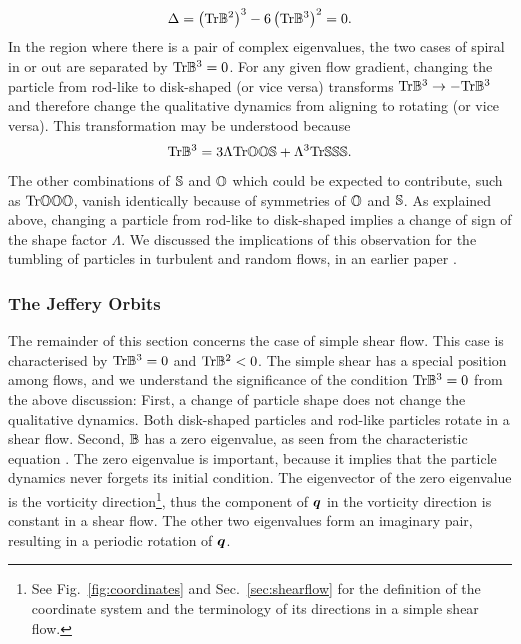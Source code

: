 \documentclass[thesis.tex]{subfiles}
\begin{document}
\begin{align}
 	\Delta = \left(\mbox{Tr} \mathbb{B}^2\right)^3 - 6\left(\mbox{Tr} \mathbb{B}^3\right)^2 = 0.
 \end{align} 
In the region where there is a pair of complex eigenvalues, the two cases of spiral in or out are separated by $\mbox{Tr} \mathbb{B}^3=0$. For any given flow gradient, changing the particle from rod-like to disk-shaped (or vice versa) transforms $\mbox{Tr} \mathbb{B}^3\to-\mbox{Tr}\mathbb{B}^3$ and therefore change the qualitative dynamics from aligning to rotating (or vice versa). This transformation may be understood because
\begin{align}
	\mbox{Tr} \mathbb{B}^3 = 3\Lambda \mbox{Tr} \mathbb{O}\mathbb{O} \mathbb{S} + \Lambda^3 \mbox{Tr} \mathbb{S}\mathbb{S} \mathbb{S}.
\end{align}
The other combinations of $\mathbb{S}$ and $\mathbb{O}$ which could be expected to contribute, such as $\mbox{Tr} \mathbb{O}\mathbb{O} \mathbb{O}$, vanish identically because of symmetries of $\mathbb{O}$ and $\mathbb{S}$. As explained above, changing a particle from rod-like to disk-shaped implies a change of sign of the shape factor $\Lambda$. We discussed the implications of this observation for the tumbling of particles in turbulent and random flows, in an earlier paper \cite{gustavsson2014}.

\subsubsection{The Jeffery Orbits}

The remainder of this section concerns the case of simple shear flow. This case is characterised by $\mbox{Tr} \mathbb{B}^3=0$ and $\mbox{Tr} \mathbb{B}^2<0$. The simple shear has a special position among flows, and we understand the significance of the condition $\mbox{Tr}\mathbb{B}^3=0$ from the above discussion: First, a change of particle shape does not change the qualitative dynamics. Both disk-shaped particles and rod-like particles rotate in a shear flow. Second, $\mathbb{B}$ has a zero eigenvalue, as seen from the characteristic equation . The zero eigenvalue is important, because it implies that the particle dynamics never forgets its initial condition. The eigenvector of the zero eigenvalue is the vorticity direction\footnote{See Fig.~\ref{fig:coordinates} and Sec.~\ref{sec:shearflow} for the definition of the coordinate system and the terminology of its directions in a simple shear flow.}, thus the component of $\mbox{\boldmath$q$}$ in the vorticity direction is constant in a shear flow. The other two eigenvalues form an imaginary pair, resulting in a periodic rotation of $\mbox{\boldmath$q$}$.
\end{document}
